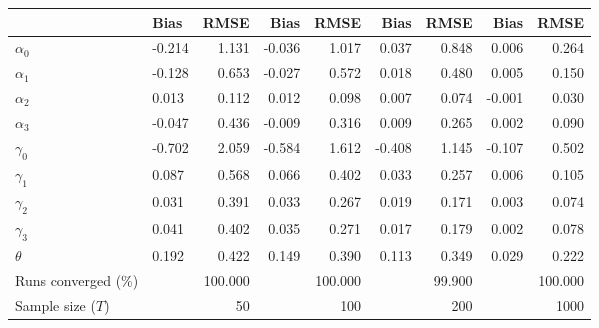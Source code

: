 
\begin{tabular}[t]{llrrrrrrr}
\toprule
  & Bias & RMSE & Bias & RMSE & Bias & RMSE & Bias & RMSE\\
\midrule
$\alpha_{0}$ & -0.214 & 1.131 & -0.036 & 1.017 & 0.037 & 0.848 & 0.006 & 0.264\\
$\alpha_{1}$ & -0.128 & 0.653 & -0.027 & 0.572 & 0.018 & 0.480 & 0.005 & 0.150\\
$\alpha_{2}$ & 0.013 & 0.112 & 0.012 & 0.098 & 0.007 & 0.074 & -0.001 & 0.030\\
$\alpha_{3}$ & -0.047 & 0.436 & -0.009 & 0.316 & 0.009 & 0.265 & 0.002 & 0.090\\
$\gamma_{0}$ & -0.702 & 2.059 & -0.584 & 1.612 & -0.408 & 1.145 & -0.107 & 0.502\\
$\gamma_{1}$ & 0.087 & 0.568 & 0.066 & 0.402 & 0.033 & 0.257 & 0.006 & 0.105\\
$\gamma_{2}$ & 0.031 & 0.391 & 0.033 & 0.267 & 0.019 & 0.171 & 0.003 & 0.074\\
$\gamma_{3}$ & 0.041 & 0.402 & 0.035 & 0.271 & 0.017 & 0.179 & 0.002 & 0.078\\
$\theta$ & 0.192 & 0.422 & 0.149 & 0.390 & 0.113 & 0.349 & 0.029 & 0.222\\
Runs converged (\%) &  & 100.000 &  & 100.000 &  & 99.900 &  & 100.000\\
Sample size ($T$) &  & 50 &  & 100 &  & 200 &  & 1000\\
\bottomrule
\end{tabular}
